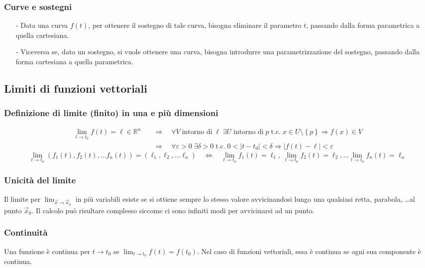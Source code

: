 \documentclass[a4paper]{article}
\newcommand\Rn{\mathbb{R}^n}  %
\newcommand\tc{\text{t.c.}}   %
\begin{document}
\subsubsection*{Curve e sostegni}
\begin{itemize}[topsep=3pt, itemsep=0pt]
	\item[-] Data una curva \(f(t)\), per ottenere il sostegno di tale curva, bisogna eliminare il parametro \(t\), passando dalla
	forma parametrica a quella cartesiana.
	\item[-] Viceversa se, dato un sostegno, si vuole ottenere una curva, bisogna introdurre una parametrizzazione del sostegno,
	passando dalla forma cartesiana a quella parametrica.
\end{itemize}

\subsection{Limiti di funzioni vettoriali}
\subsubsection*{Definizione di limite (finito) in una e più dimensioni}
\begin{align*}
	\lim_{t \to t_0} f(t) = \ell \in \Rn \quad &\Rightarrow \quad \forall V \; \text{intorno di} \; \ell \; \exists U \; \text{intorno di} \; p \; \tc \; x \in U \setminus \left\{p\right\} \Rightarrow f(x) \in V \\
	&\Rightarrow \quad \forall \varepsilon > 0 \; \exists \delta > 0 \; \tc \; 0 < \left|t-t_0\right| < \delta \Rightarrow \left|f(t) - \ell\right| < \varepsilon
\end{align*}
\[\lim_{t \to t_0} (f_1(t), f_2(t), \dots f_n(t)) = (\ell_1, \ell_2, \dots \ell_n) \quad \Leftrightarrow \quad \lim_{t \to t_0} f_1(t) = \ell_1, \; \lim_{t \to t_0} f_2(t) = \ell_2, \dots \lim_{t \to t_0} f_n(t) = \ell_n\]

\subsubsection*{Unicità del limite}
Il limite per \(\lim_{\vec{x} \to \vec{x}_0}\) in più variabili esiste se si ottiene sempre lo stesso valore avvicinandosi lungo
una qualsiasi retta, parabola, \dots al punto \(\vec{x}_0\). Il calcolo può risultare complesso siccome ci sono infiniti modi per
avvicinarsi ad un punto.

\subsubsection*{Continuità}
Una funzione è continua per \(t \to t_0\) se \(\displaystyle\lim_{t \to t_0} f(t) = f(t_0)\). Nel caso di funzioni vettoriali, essa è continua se ogni sua componente
è continua.
\end{document}
